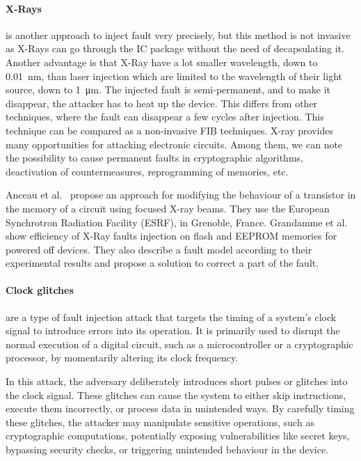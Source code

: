 \paragraph{X-Rays} is another approach to inject fault very precisely, but this method is not invasive as \mbox{X-Rays} can go through the IC package without the need of decapsulating it. Another advantage is that X-Ray have a lot smaller wavelength, down to \SI{0.01}{\nano\meter}, than laser injection which are limited to the wavelength of their light source, down to \SI{1}{\micro\meter}.
The injected fault is semi-permanent, and to make it disappear, the attacker has to heat up the device. This differs from other techniques, where the fault can disappear a few cycles after injection.
This technique can be compared as a non-invasive FIB techniques. X-ray provides many opportunities for attacking electronic circuits. Among them, we can note the possibility to cause permanent faults in cryptographic algorithms, deactivation of countermeasures, reprogramming of memories, etc.

Anceau et al.~\cite{ABCMRT-17-ches, BAMCST-23-dft} propose an approach for modifying the behaviour of a transistor in the memory of a circuit using focused X-ray beams. 
They use the European Synchrotron Radiation Facility (ESRF), in Grenoble, France.
Grandamme et al.~\cite{GBD-23-paine} show efficiency of X-Ray faults injection on flash and EEPROM memories for powered off devices. They also describe a fault model according to their experimental results and propose a solution to correct a part of the fault.

\paragraph{Clock glitches} are a type of fault injection attack that targets the timing of a system's clock signal to introduce errors into its operation. It is primarily used to disrupt the normal execution of a digital circuit, such as a microcontroller or a cryptographic processor, by momentarily altering its clock frequency.

In this attack, the adversary deliberately introduces short pulses or glitches into the clock signal. These glitches can cause the system to either skip instructions, execute them incorrectly, or process data in unintended ways. By carefully timing these glitches, the attacker may manipulate sensitive operations, such as cryptographic computations, potentially exposing vulnerabilities like secret keys, bypassing security checks, or triggering unintended behaviour in the device.

